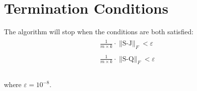 \documentclass{article}
\begin{document}
\section{Termination Conditions}
The algorithm will stop when the conditions are both satisfied:
\begin{eqnarray}
\begin{array}{l}
\frac{1}{m \times k} \cdot \mathop{\parallel S-J \parallel}_F < \varepsilon \\\\
\frac{1}{m \times k} \cdot \mathop{\parallel S-Q \parallel}_F < \varepsilon \\
\end{array}
\end{eqnarray}\\
where $\varepsilon = 10^{-8}$.\\
\end{document}
